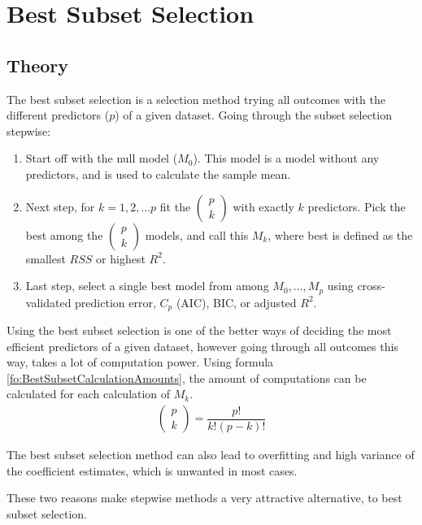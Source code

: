 \section{Best Subset Selection}
\subsection{Theory}
The best subset selection is a selection method trying all outcomes with the different predictors ($p$) of a given dataset. Going through the subset selection stepwise:
\begin{enumerate}
	\item Start off with the null model ($M_0$). This model is a model without any predictors, and is used to calculate the sample mean. 
	\item Next step, for $k = 1, 2, \dots p$ fit the $( \begin{smallmatrix} p \\ k \end{smallmatrix} )$ with exactly $k$ predictors. Pick the best among the $( \begin{smallmatrix} p \\ k \end{smallmatrix} )$ models, and call this $M_k$, where best is defined as the smallest $RSS$ or highest $R^2$.
	\item Last step, select a single best model from among $M_0,\dots,M_p$ using cross-validated prediction error, $C_p$ (AIC), BIC, or adjusted $R^2$.
\end{enumerate}
 
Using the best subset selection is one of the better ways of deciding the most efficient predictors of a given dataset, however going through all outcomes this way, takes a lot of computation power. Using formula \ref{fo:BestSubsetCalculationAmounts}, the amount of computations can be calculated for each calculation of $M_k$.
\begin{align}\label{fo:BestSubsetCalculationAmounts}
	\begin{pmatrix}
		p \\ k
	\end{pmatrix}
	= \dfrac{p!}{k!(p-k)!}
\end{align}

The best subset selection method can also lead to overfitting and high variance of the coefficient estimates, which is unwanted in most cases. 

These two reasons make stepwise methods a very attractive alternative, to best subset selection. 

